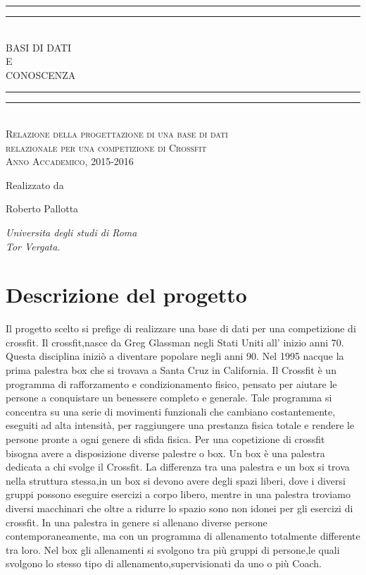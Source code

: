 \documentclass[12pt,a4paper]{article}
\newcommand*{\titleGP}{\begingroup %
\centering %
\vspace*{\baselineskip} %

\rule{\textwidth}{1.6pt}\vspace*{-\baselineskip}\vspace*{2pt} %
\rule{\textwidth}{0.4pt}\\[\baselineskip] %

{\LARGE BASI DI DATI\\ E \\[0.3\baselineskip] CONOSCENZA}\\[0.2\baselineskip] %

\rule{\textwidth}{0.4pt}\vspace*{-\baselineskip}\vspace{3.2pt} %
\rule{\textwidth}{1.6pt}\\[\baselineskip] %

\scshape %
Relazione della progettazione di una base di dati\\
relazionale per una competizione di Crossfit\\
[\baselineskip] %
Anno Accademico, 2015-2016\par %

\vspace*{2\baselineskip} %

Realizzato da \\[\baselineskip]
{\Large Roberto Pallotta\par} %
{\itshape Universita degli studi di Roma \\ Tor Vergata.\par} %

\vfill %

\endgroup}
\begin{document}
\titleGP
\newpage
\tableofcontents
\listoffigures
\newpage
\pagestyle{fancy}
\lhead{}
\chead{}
\renewcommand{\headrulewidth}{0.4pt}
\renewcommand{\footrulewidth}{0.4pt}
\section{Descrizione del progetto}

Il progetto scelto si prefige di realizzare una base di dati per una competizione di crossfit.
Il crossfit,nasce da Greg Glassman negli Stati Uniti all' inizio anni 70. Questa disciplina iniziò a diventare
popolare negli anni 90. Nel 1995 nacque la prima palestra box che si trovava a Santa Cruz in California.
Il Crossfit è un programma di rafforzamento e condizionamento fisico, pensato per aiutare le persone a conquistare un benessere completo e generale. Tale programma si concentra su una serie di movimenti funzionali che cambiano costantemente, eseguiti ad alta intensità, per raggiungere una prestanza fisica totale e rendere le persone pronte a ogni genere di sfida fisica.
Per una copetizione di crossfit bisogna avere a disposizione diverse palestre o box.
Un box è una palestra dedicata a chi svolge il Crossfit. La differenza tra una palestra e un box si trova nella struttura stessa,in un box si devono avere degli spazi liberi, dove i diversi gruppi possono eseguire esercizi a corpo libero, mentre in una palestra troviamo diversi macchinari che oltre a ridurre lo spazio sono non idonei per gli esercizi di crossfit.
In una palestra in genere si allenano diverse persone contemporaneamente, ma con un programma di allenamento totalmente differente tra loro. Nel box gli allenamenti si svolgono tra più gruppi di persone,le quali svolgono lo stesso tipo di allenamento,supervisionati da uno o più Coach.
\end{document}
